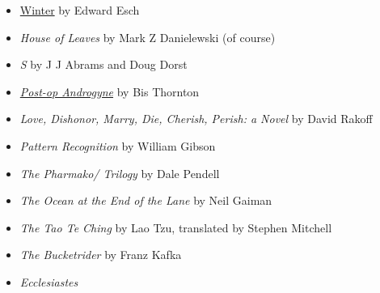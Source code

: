 \begin{itemize}
\tightlist
\item
  \href{https://ericwhitacre.com/music-catalog/winter}{Winter} by Edward Esch
\item
  \emph{House of Leaves} by Mark Z Danielewski (of course)
\item
  \emph{S} by J J Abrams and Doug Dorst
\item
  \href{http://www.bisthebox.com/comics/post-op-androgyne/}{\emph{Post-op Androgyne}} by Bis Thornton
\item
  \emph{Love, Dishonor, Marry, Die, Cherish, Perish: a Novel} by David Rakoff
\item
  \emph{Pattern Recognition} by William Gibson
\item
  \emph{The Pharmako/ Trilogy} by Dale Pendell
\item
  \emph{The Ocean at the End of the Lane} by Neil Gaiman
\item
  \emph{The Tao Te Ching} by Lao Tzu, translated by Stephen Mitchell
\item
  \emph{The Bucketrider} by Franz Kafka
\item
  \emph{Ecclesiastes}
\end{itemize}
